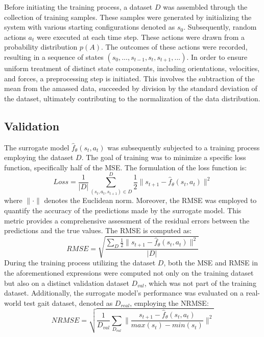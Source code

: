 Before initiating the training process, a dataset $D$ was assembled through the collection of training samples. These samples were generated by initializing the system with various starting configurations denoted as $s_0$. Subsequently, random actions $a_t$ were executed at each time step. These actions were drawn from a probability distribution $p(A)$. The outcomes of these actions were recorded, resulting in a sequence of states $(s_0, ..., s_{t-1}, s_t, s_{t+1}, ...)$. In order to ensure uniform treatment of distinct state components, including orientations, velocities, and forces, a preprocessing step is initiated. This involves the subtraction of the mean from the amassed data, succeeded by division by the standard deviation of the dataset, ultimately contributing to the normalization of the data distribution.

\subsection{Validation}
The surrogate model $\hat{f}_\theta(s_t, a_t)$ was subsequently subjected to a training process employing the dataset $D$. The goal of training was to minimize a specific loss function, specifically half of the \ac{MSE}. The formulation of the loss function is: 
\begin{equation}
    Loss = \frac{1}{|D|}\sum_{(s_t,a_t, s_{t+1}) \in D}^{D} \frac{1}{2}\lVert s_{t+1}-\hat{f}_\theta(s_t, a_t)\rVert^2
\label{eq:loss}
\end{equation}
where $\lVert\cdot\rVert$ denotes the Euclidean norm. Moreover, the \ac{RMSE} was employed to quantify the accuracy of the predictions made by the surrogate model. This metric provides a comprehensive assessment of the residual errors between the predictions and the true values. The \ac{RMSE} is computed as: 
\begin{equation}
    RMSE = \sqrt{\frac{\sum_{D} \frac{1}{2}\lVert s_{t+1}-\hat{f}_\theta(s_t, a_t)\rVert^2}{|D|}}
    \label{eq:RMSE}
\end{equation}
During the training process utilizing the dataset $D$, both the \ac{MSE} and \ac{RMSE} in the aforementioned expressions were computed not only on the training dataset but also on a distinct validation dataset $D_{val}$, which was not part of the training dataset. Additionally, the surrogate model's performance was evaluated on a real-world test gait dataset, denoted as $D_{real}$, employing the \ac{NRMSE}:
\begin{equation}
    NRMSE = \sqrt{\frac{1}{D_{val}}\sum_{D_{val}}\lVert \frac{s_{t+1}-\hat{f}_\theta(s_t, a_t)}{max(s_t) - min(s_t)}\rVert^2}
    \label{eq:NRMSE}
\end{equation}

